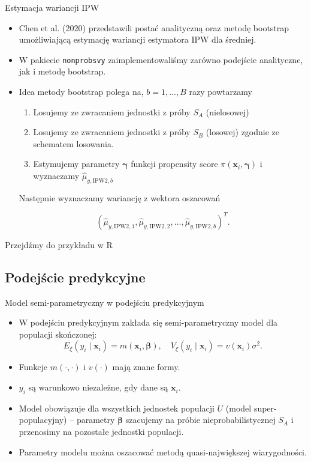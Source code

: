 \documentclass[10pt,ignorenonframetext, aspectratio=169]{beamer}
\newcommand{\bx}{\boldsymbol{x}}
\newcommand{\bbeta}{\boldsymbol{\beta}}
\newcommand{\bgamma}{\boldsymbol{\gamma}}
\begin{document}
\begin{frame}{Estymacja wariancji IPW}
\begin{itemize}
\justifying
    \item Chen et al. (2020) przedstawili postać analityczną oraz metodę bootstrap umożliwiającą estymację wariancji estymatora IPW dla średniej.
    \item W pakiecie \texttt{nonprobsvy} zaimplementowaliśmy zarówno podejście analityczne, jak i metodę bootstrap.
    \item Idea metody bootstrap polega na, $b=1,...,B$ razy powtarzamy
    \begin{enumerate}
        \item Losujemy ze zwracaniem jednostki z próby $S_A$ (nielosowej)
        \item Losujemy ze zwracaniem jednostki z próby $S_B$ (losowej) zgodnie ze schematem losowania.
        \item Estymujemy parametry $\bgamma$ funkcji propensity score $\pi\left(\bx_i, \bgamma\right)$ i wyznaczamy $\hat{\mu}_{y,\text{IPW2},b}$
    \end{enumerate}
    Następnie wyznaczamy wariancję z wektora oszacowań 
    
    $$
    \left(\hat{\mu}_{y,\text{IPW2},1}, \hat{\mu}_{y,\text{IPW2},2}, ..., \hat{\mu}_{y,\text{IPW2},b}\right)^T.
    $$
\end{itemize}
\end{frame}

\begin{frame}{}
    Przejdźmy do przykładu w R
\end{frame}

\subsection{Podejście predykcyjne}

\begin{frame}{Model semi-parametryczny w podejściu predykcyjnym}
\begin{itemize}
    \item W podejściu predykcyjnym zakłada się semi-parametryczny model dla populacji skończonej:
    \begin{equation*}
    E_{\xi}\left(y_i \mid \bx_i\right)=m\left(\bx_i, \bbeta\right), \quad V_{\xi}\left(y_i \mid \bx_i\right)=v\left(\bx_i\right) \sigma^2.
    \end{equation*}
    \item Funkcje $m(\cdot,\cdot)$ i $v(\cdot)$ mają znane formy.
    \item $y_i$ są warunkowo niezależne, gdy dane są $\bx_i$.
    \item Model obowiązuje dla wszystkich jednostek populacji $U$ (model super-populacyjny) -- parametry $\bbeta$ szacujemy na próbie nieprobabilistycznej $S_A$ i przenosimy na pozostałe jednostki populacji.
    \item Parametry modelu można oszacować metodą quasi-największej wiarygodności.
\end{itemize}
\end{frame}
\end{document}
